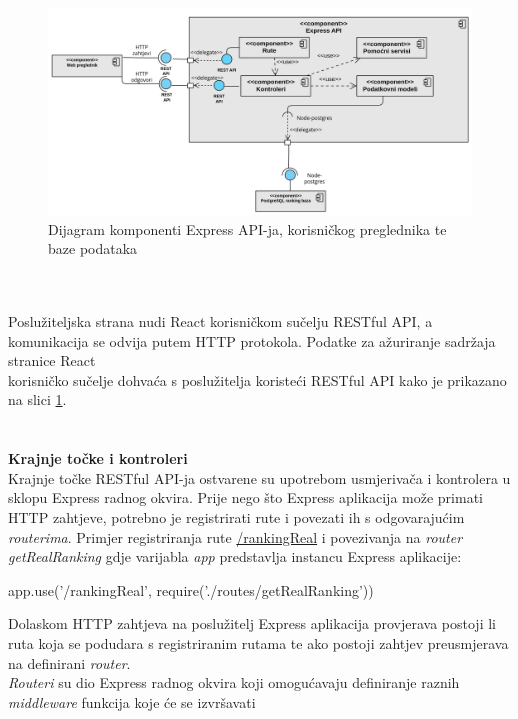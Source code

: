 \documentclass[times, utf8, zavrsni]{fer}
\begin{document}
\begin{figure}[htb]
    \hspace*{-2cm} 
       \includegraphics[scale=0.36]{expressdijagramkomponenti.png} 
       \caption{Dijagram komponenti Express API-ja, korisničkog preglednika te baze podataka}
       \label{fig:expressdijagramkomponenti}
       \end{figure}      
\\\\Poslužiteljska strana nudi React korisničkom sučelju RESTful API, a komunikacija se odvija putem HTTP protokola. Podatke za ažuriranje sadržaja stranice 
React \\korisničko sučelje dohvaća s poslužitelja koristeći RESTful API kako je prikazano na slici \ref{fig:expressdijagramkomponenti}.
\\\\\\\textbf{Krajnje točke i kontroleri}
\\Krajnje točke  RESTful API-ja ostvarene su upotrebom usmjerivača  i kontrolera u sklopu Express radnog okvira. 
Prije nego što Express aplikacija može primati HTTP zahtjeve, potrebno je registrirati rute i povezati ih s odgovarajućim \emph{routerima}.
Primjer registriranja rute \url{/rankingReal} i povezivanja na \emph{router} \emph{getRealRanking} gdje varijabla \emph{app} predstavlja instancu Express aplikacije:
\begin{verbnobox}[\fontsize{10pt}{10pt}\selectfont] 
app.use('/rankingReal', require('./routes/getRealRanking'))
\end{verbnobox}  
Dolaskom HTTP zahtjeva na poslužitelj Express aplikacija provjerava postoji li ruta koja se podudara s registriranim rutama te ako postoji 
zahtjev preusmjerava na definirani \emph{router}.
\\\emph{Routeri} su dio Express radnog okvira koji omogućavaju definiranje raznih \emph{middleware} funkcija koje će se izvršavati 
\end{document}
